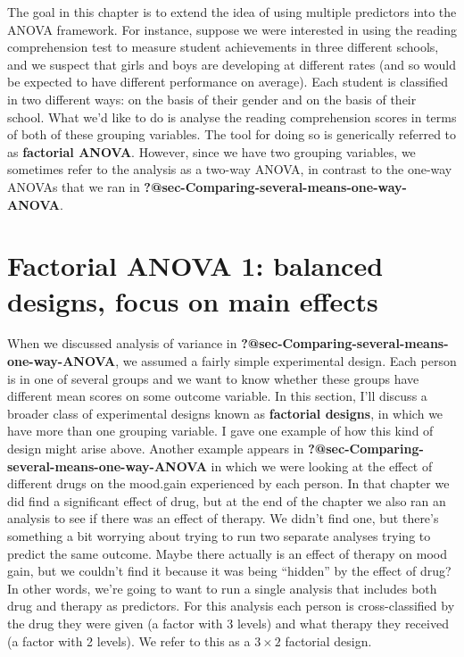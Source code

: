 \documentclass[
  a4paper,
]{book}
\begin{document}
The goal in this chapter is to extend the idea of using multiple
predictors into the ANOVA framework. For instance, suppose we were
interested in using the reading comprehension test to measure student
achievements in three different schools, and we suspect that girls and
boys are developing at different rates (and so would be expected to have
different performance on average). Each student is classified in two
different ways: on the basis of their gender and on the basis of their
school. What we'd like to do is analyse the reading comprehension scores
in terms of both of these grouping variables. The tool for doing so is
generically referred to as \textbf{factorial ANOVA}. However, since we
have two grouping variables, we sometimes refer to the analysis as a
two-way ANOVA, in contrast to the one-way ANOVAs that we ran in
\textbf{?@sec-Comparing-several-means-one-way-ANOVA}.

\hypertarget{factorial-anova-1-balanced-designs-focus-on-main-effects}{%
\section{Factorial ANOVA 1: balanced designs, focus on main
effects}\label{factorial-anova-1-balanced-designs-focus-on-main-effects}}

When we discussed analysis of variance in
\textbf{?@sec-Comparing-several-means-one-way-ANOVA}, we assumed a
fairly simple experimental design. Each person is in one of several
groups and we want to know whether these groups have different mean
scores on some outcome variable. In this section, I'll discuss a broader
class of experimental designs known as \textbf{factorial designs}, in
which we have more than one grouping variable. I gave one example of how
this kind of design might arise above. Another example appears in
\textbf{?@sec-Comparing-several-means-one-way-ANOVA} in which we were
looking at the effect of different drugs on the mood.gain experienced by
each person. In that chapter we did find a significant effect of drug,
but at the end of the chapter we also ran an analysis to see if there
was an effect of therapy. We didn't find one, but there's something a
bit worrying about trying to run two separate analyses trying to predict
the same outcome. Maybe there actually is an effect of therapy on mood
gain, but we couldn't find it because it was being ``hidden'' by the
effect of drug? In other words, we're going to want to run a single
analysis that includes both drug and therapy as predictors. For this
analysis each person is cross-classified by the drug they were given (a
factor with 3 levels) and what therapy they received (a factor with 2
levels). We refer to this as a \(3 \times 2\) factorial design.
\end{document}
